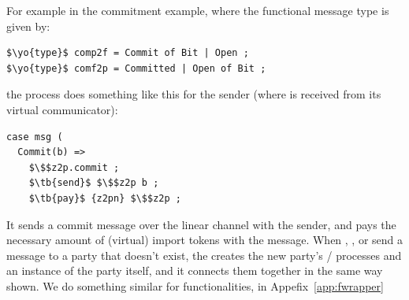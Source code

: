
For example in the commitment example, where the functional message type is given by: 
\begin{lstlisting}[basicstyle=\footnotesize\BeraMonottFamily, mathescape]
$\yo{type}$ comp2f = Commit of Bit | Open ;
$\yo{type}$ comf2p = Committed | Open of Bit ;
\end{lstlisting}
the  process does something like this for the sender (where  is received from its virtual communicator):
\begin{lstlisting}[basicstyle=\footnotesize\BeraMonottFamily, frame=single, mathescape]
case msg (
  Commit(b) =>
    $\$$z2p.commit ;
    $\tb{send}$ $\$$z2p b ;
    $\tb{pay}$ {z2pn} $\$$z2p ;
\end{lstlisting}
It sends a commit message over the linear channel with the sender, and pays the necessary amount of (virtual) import tokens with the message.
When \Z, \A, or \F send a message to a party that doesn't exist, the \partywrapper creates the new party's / processes and an instance of the party itself, and it connects them together in the same way shown. 
We do something similar for functionalities, in Appefix~\ref{app:fwrapper}


